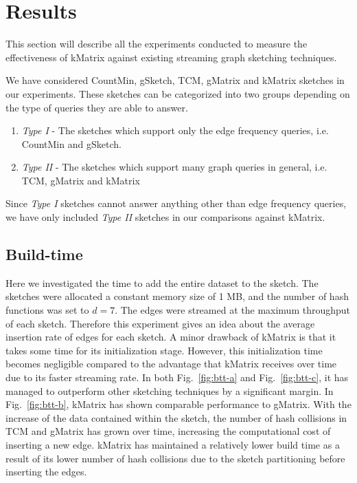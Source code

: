 \section{Results}

This section will describe all the experiments conducted to measure the effectiveness of kMatrix against existing streaming graph sketching techniques. 

We have considered CountMin, gSketch, TCM, gMatrix and kMatrix sketches in our experiments. These sketches can be categorized into two groups depending on the type of queries they are able to answer.

\begin{enumerate}
    \item \emph{Type I} - The sketches which support only the edge frequency queries, i.e. CountMin and gSketch.
    \item \emph{Type II} - The sketches which support many graph queries in general, i.e. TCM, gMatrix and kMatrix
\end{enumerate}

Since \emph{Type I} sketches cannot answer anything other than edge frequency queries, we have only included \emph{Type II} sketches in our comparisons against kMatrix.

\subsection{Build-time}

Here we investigated the time to add the entire dataset to the sketch. The sketches were allocated a constant memory size of 1 MB, and the number of hash functions was set to \(d = 7\). The edges were streamed at the maximum throughput of each sketch. Therefore this experiment gives an idea about the average insertion rate of edges for each sketch. A minor drawback of kMatrix is that it takes some time for its initialization stage. However, this initialization time becomes negligible compared to the advantage that kMatrix receives over time due to its faster streaming rate. In both Fig.~\ref{fig:btt-a} and Fig.~\ref{fig:btt-c}, it has managed to outperform other sketching techniques by a significant margin. In Fig.~\ref{fig:btt-b}, kMatrix has shown comparable performance to gMatrix. With the increase of the data contained within the sketch, the number of hash collisions in TCM and gMatrix has grown over time, increasing the computational cost of inserting a new edge. kMatrix has maintained a relatively lower build time as a result of its lower number of hash collisions due to the sketch partitioning before inserting the edges.

